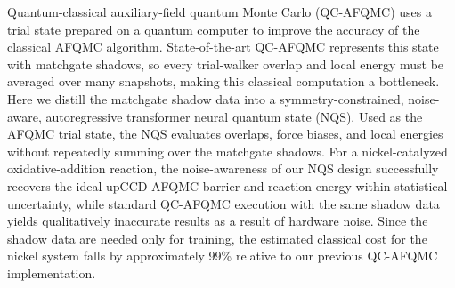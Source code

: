\documentclass[12pt,letterpaper]{article}
\begin{document}
{\footnotesize Quantum-classical auxiliary-field quantum Monte Carlo (QC-AFQMC) uses a trial state prepared on a quantum computer to improve the accuracy of the classical AFQMC algorithm. State-of-the-art QC-AFQMC represents this state with matchgate shadows, so every trial-walker overlap and local energy must be averaged over many snapshots, making this classical computation a bottleneck. Here we distill the matchgate shadow data into a symmetry-constrained, noise-aware, autoregressive transformer neural quantum state (NQS). Used as the AFQMC trial state, the NQS evaluates overlaps, force biases, and local energies without repeatedly summing over the matchgate shadows. For a nickel-catalyzed oxidative-addition reaction, the noise-awareness of our NQS design successfully recovers the ideal-upCCD AFQMC barrier and reaction energy within statistical uncertainty, while standard QC-AFQMC execution with the same shadow data yields qualitatively inaccurate results as a result of hardware noise. Since the shadow data are needed only for training, the estimated classical cost for the nickel system falls by approximately 99\% relative to our previous QC-AFQMC implementation.\par}
\medskip
\end{document}
